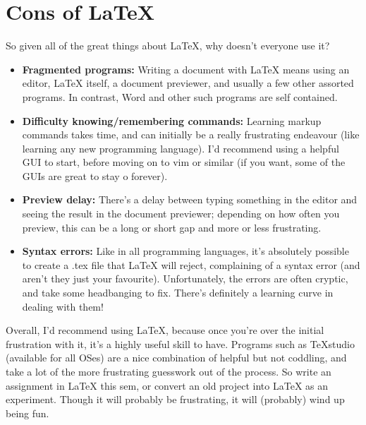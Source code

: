 \documentclass{article}
\begin{document}
\section*{Cons of LaTeX}
So given all of the great things about LaTeX, why doesn’t everyone use it?
\begin{itemize}
\item \textbf{Fragmented programs:} Writing a document with LaTeX means using an editor, LaTeX itself, a document previewer, and usually a few other assorted programs. In contrast, Word and other such programs are self contained.
\item \textbf{Difficulty knowing/remembering commands:} Learning markup commands takes time, and can initially be a really frustrating endeavour (like learning any new programming language). I’d recommend using a helpful GUI to start, before moving on to vim or similar (if you want, some of the GUIs are great to stay o forever).
\item \textbf{Preview delay:} There’s a delay between typing something in the editor and seeing the result in the document previewer; depending on how often you preview, this can be a long or short gap and more or less frustrating.
\item \textbf{Syntax errors:} Like in all programming languages, it’s absolutely possible to create a .tex file that LaTeX will reject, complaining of a syntax error (and aren’t they just your favourite). Unfortunately, the errors are often cryptic, and take some headbanging to fix. There’s definitely a learning curve in dealing with them!
\end{itemize}

Overall, I’d recommend using LaTeX, because once you’re over the initial frustration with it, it’s a highly useful skill to have. Programs such as TeXstudio (available for all OSes) are a nice combination of helpful but not coddling, and take a lot of the more frustrating guesswork out of the process. So write an assignment in LaTeX this sem, or convert an old project into LaTeX as an experiment. Though it will probably be frustrating, it will (probably) wind up being fun.
\end{document}
